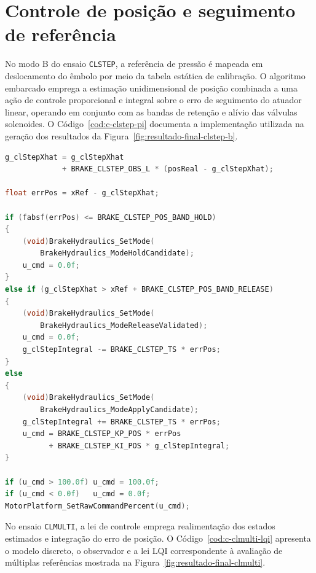 \section{Controle de posição e seguimento de referência}
\label{ap:codigo-c-controle}

No modo B do ensaio \texttt{CLSTEP}, a referência de pressão é mapeada em deslocamento do êmbolo por meio da tabela estática de calibração. O algoritmo embarcado emprega a estimação unidimensional de posição combinada a uma ação de controle proporcional e integral sobre o erro de seguimento do atuador linear, operando em conjunto com as bandas de retenção e alívio das válvulas solenoides. O Código~\ref{cod:c-clstep-pi} documenta a implementação utilizada na geração dos resultados da Figura~\ref{fig:resultado-final-clstep-b}.

\begin{lstlisting}[language=C,caption={Observador e controle de posicao no modo B do ensaio CLSTEP.},label={cod:c-clstep-pi}]
g_clStepXhat = g_clStepXhat
             + BRAKE_CLSTEP_OBS_L * (posReal - g_clStepXhat);

float errPos = xRef - g_clStepXhat;

if (fabsf(errPos) <= BRAKE_CLSTEP_POS_BAND_HOLD)
{
    (void)BrakeHydraulics_SetMode(
        BrakeHydraulics_ModeHoldCandidate);
    u_cmd = 0.0f;
}
else if (g_clStepXhat > xRef + BRAKE_CLSTEP_POS_BAND_RELEASE)
{
    (void)BrakeHydraulics_SetMode(
        BrakeHydraulics_ModeReleaseValidated);
    u_cmd = 0.0f;
    g_clStepIntegral -= BRAKE_CLSTEP_TS * errPos;
}
else
{
    (void)BrakeHydraulics_SetMode(
        BrakeHydraulics_ModeApplyCandidate);
    g_clStepIntegral += BRAKE_CLSTEP_TS * errPos;
    u_cmd = BRAKE_CLSTEP_KP_POS * errPos
          + BRAKE_CLSTEP_KI_POS * g_clStepIntegral;
}

if (u_cmd > 100.0f) u_cmd = 100.0f;
if (u_cmd < 0.0f)   u_cmd = 0.0f;
MotorPlatform_SetRawCommandPercent(u_cmd);
\end{lstlisting}

No ensaio \texttt{CLMULTI}, a lei de controle emprega realimentação dos estados estimados e integração do erro de posição. O Código~\ref{cod:c-clmulti-lqi} apresenta o modelo discreto, o observador e a lei LQI correspondente à avaliação de múltiplas referências mostrada na Figura~\ref{fig:resultado-final-clmulti}.

